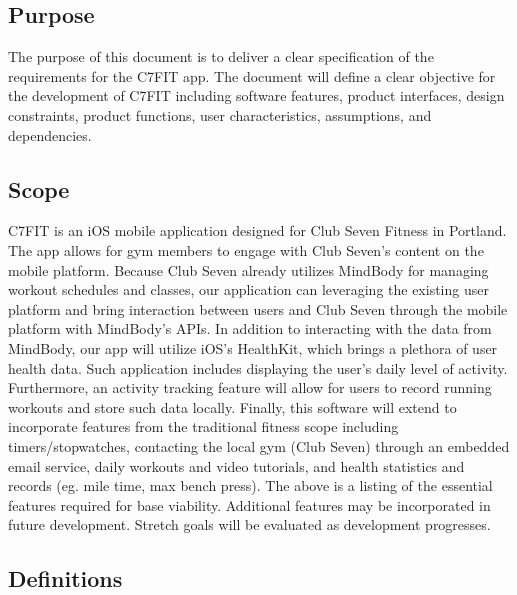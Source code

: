 \documentclass[letterpaper,10pt,titlepage]{article}
\begin{document}
\subsection{Purpose}

The purpose of this document is to deliver a clear specification of the requirements for the C7FIT app. The document will define a clear objective for the development of C7FIT including software features, product interfaces, design constraints, product functions, user characteristics, assumptions, and dependencies.

\subsection{Scope}

C7FIT is an iOS mobile application designed for Club Seven Fitness in Portland. The app allows for gym members to engage with Club Seven’s content on the mobile platform. Because Club Seven already utilizes MindBody for managing workout schedules and classes, our application can leveraging the existing user platform and bring interaction between users and Club Seven through the mobile platform with MindBody’s APIs.
In addition to interacting with the data from MindBody, our app will utilize iOS’s HealthKit, which brings a plethora of user health data.  Such application includes displaying the user’s daily level of activity. Furthermore, an activity tracking feature will allow for users to record running workouts and store such data locally. Finally, this software will extend to incorporate features from the traditional fitness scope including timers/stopwatches, contacting the local gym (Club Seven) through an embedded email service, daily workouts and video tutorials, and health statistics and records (eg. mile time, max bench press). The above is a listing of the essential features required for base viability. Additional features may be incorporated in future development. Stretch goals will be evaluated as development progresses.

\subsection{Definitions}
\end{document}
